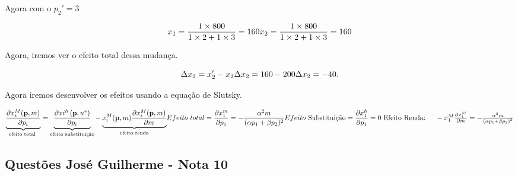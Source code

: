 \begin{flushleft}
\begin{center}
Agora com o $p_{2}' = 3$
\end{center}

\begin{equation}
x_{1} = \dfrac{1 \times 800}{1 \times 2 + 1 \times 3 } = 160
$$\\$$
x_{2} = \dfrac{1 \times 800}{1 \times 2 + 1 \times 3 } = 160
\end{equation}

\begin{center}
Agora, iremos ver o efeito total dessa mudança.
\end{center}

\begin{equation}
\Delta x_{2} = x_{2}' - x_{2}
$$\\$$
\Delta x_{2} = 160 - 200
$$\\$$
\Delta x_{2} = -40.
\end{equation}

\begin{center}
Agora iremos desenvolver os efeitos usando a equação de Slutsky.
\end{center}

\begin{equation}
$$\\$$
\underbrace{{\dfrac{\partial x_{i}^{M}(\mathbf{p}, m)}{\partial p_{i}}}}_{{\text {efeito total }}}= \underbrace{{\dfrac{\partial x{i}^{h}\left(\mathbf{p}, u^{*}\right)}{\partial p_{i}}}}_{{\text {efeito substituição}}} - \underbrace{ x_{i}^{M}(\mathbf{p}, m) \dfrac{\partial x_{i}^{M}(\mathbf{p}, m)}{\partial m}}_{{\text {efeito renda}}}
$$\\$$
Efeito \ total = \dfrac{\partial x_{1}^{m}}{\partial p_{1}} = - \dfrac{\alpha^{2}m}{(\alpha p_{1} + \beta p_{2})^{2}}
$$\\$$
Efeito \ \text{Substituição} = \dfrac{\partial x_{1}^{h}}{\partial p_{1}}=0
$$\\$$
\text { Efeito Renda: } \quad-x_{1}^{M} \frac{\partial x_{1}^{M}}{\partial m}=-\frac{\alpha^{2} m}{\left(\alpha p_{1}+\beta p_{2}\right)^{2}}
\end{equation}

\singlespacing

\begin{center}
	\section*{Questões José Guilherme - Nota 10}
\end{center}


\end{flushleft}
